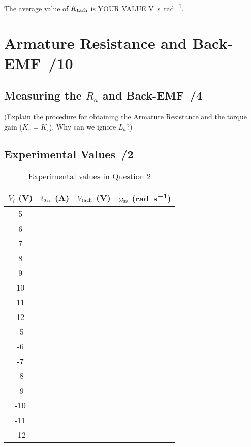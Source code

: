 \documentclass{article}
\newcommand{\score}{\hfill \underline{\hspace{0.65cm}}\,/} %
\begin{document}
The average value of $K_{\rm tach}$ is YOUR VALUE \si{\volt\second\per\radian}.

\section{Armature Resistance and Back-EMF \score 10}
\subsection{Measuring the $R_a$ and Back-EMF \score 4}
(Explain the procedure for obtaining the Armature Resistance and the torque gain ($K_v = K_{\tau}$). Why can we ignore $L_a$?)

\subsection{Experimental Values \score 2}
\begin{table}[phtb] 
\begin{center}
\caption{Experimental values in Question 2}
\label{tbl:lab4_q2_1}
\begin{tabular}{c|r|r|r} \hline \hline
\cellcolor{lightgray} $V_i$ (\si{\volt}) & \cellcolor{lightgray} $i_{a_{\rm ss}}$ (\si{\ampere}) & \cellcolor{lightgray} $V_{\rm tach}$ (\si{\volt}) & \cellcolor{lightgray} $\omega_{\rm ss}$ (\si{\radian\per\second}) \\
\hline
5 &   &   &   \\ \hline
6 &   &   &   \\ \hline
7 &   &   &  \\ \hline
8 &   &   &  \\ \hline
9 &   &   &  \\ \hline
10  &   &   &  \\ \hline
11  &   &   &  \\ \hline
12  &   &   &  \\ \hline
-5  &   &   &  \\ \hline
-6  &  &  &  \\ \hline
-7  &  &  &   \\ \hline
-8  &  &  &   \\ \hline
-9  &  &  &   \\ \hline
-10 &  &  &   \\ \hline
-11 &  &  &   \\ \hline
-12 &  &  & \\ \hline
\end{tabular}
\end{center}
\end{table}
\end{document}

